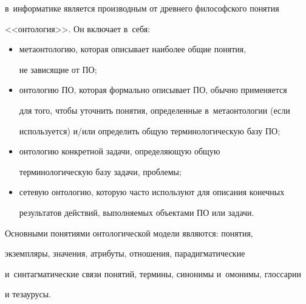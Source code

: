 в~информатике является производным от древнего философского понятия 


<<онтология>>. Он включает в~себя:


  \begin{itemize}


  \item метаонтологию, которая описывает наиболее общие понятия,  


не зависящие от ПО;


\item онтологию ПО, которая формально описывает ПО, обычно применяется 


для того, чтобы уточнить понятия, определенные в~метаонтологии (если 


используется) и\!/\!или определить общую терминологическую базу ПО;


  \item онтологию конкретной задачи, определяющую общую 


терминологическую базу задачи, проблемы;


  \item сетевую онтологию, которую часто используют для описания конечных 


результатов действий, выполняемых объектами ПО или задачи.


  \end{itemize}


  


  Основными понятиями онтологической модели являются: понятия, 


экземпляры, значения, атрибуты, отношения, парадигматические 


и~синтагматические связи понятий, термины, синонимы и~омонимы, глоссарии 


и тезаурусы.





\pagebreak





\





\vspace*{-12pt}





